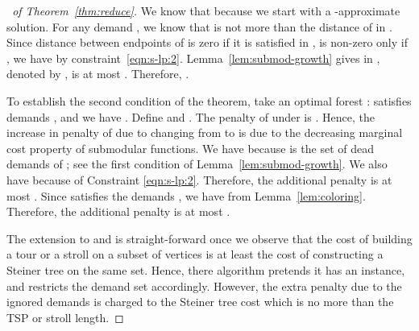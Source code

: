 \begin{proof}[\proofname\ of Theorem~\ref{thm:reduce}]
  We know that  because we
start with a -approximate solution.
For any demand , we know that  is not more than the distance of  in .
Since distance between endpoints of  is zero if it is satisfied in ,
 is non-zero only if , we have  by constraint~\eqref{eqn:s-lp:2}.
  Lemma~\ref{lem:submod-growth} gives  in , denoted by ,
is at most .
  Therefore, . 

To establish the second condition of the theorem, take an optimal forest :
 satisfies demands , and we have .
Define  and .
The penalty of  under  is .
Hence, the increase in penalty of  due to changing from  to 
is  due to the decreasing marginal cost property of submodular functions. 
We have  because  is the set of dead demands of ; see the first condition of Lemma~\ref{lem:submod-growth}.
We also have  because of Constraint \eqref{eqn:s-lp:2}.
Therefore, the additional penalty is at most .
Since  satisfies the demands ,
we have  from Lemma~\ref{lem:coloring}.
Therefore, the additional penalty is at most .


The extension to \spctsp and \spcs is straight-forward once we observe
that the cost of building a tour or a stroll on a subset  of vertices
is at least the cost of constructing a Steiner tree on the same set.
Hence, there algorithm pretends it has an  instance, and restricts
the demand set accordingly.  However, the extra penalty due to the
ignored demands  is charged to the Steiner tree cost which
is no more than the TSP or stroll length.
\end{proof}





















